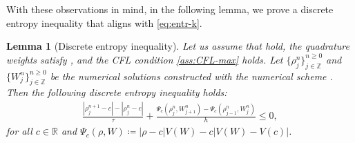 \documentclass[10pt]{amsart}
\theoremstyle{plain}
\newtheorem{lemma}{Lemma}[section]
\theoremstyle{definition}
\numberwithin{equation}{section}
\newcommand{\R}{\mathbb{R}}
\begin{document}
With these observations in mind, in the following lemma, we prove a discrete entropy inequality that aligns with \cref{eq:entr-k}.

\begin{lemma}[Discrete entropy inequality] \label{lm:entro-disc-2}  
Let us assume that  hold, the quadrature weights satisfy , and the CFL condition \cref{ass:CFL-max} holds. 
Let $\{\rho_j^n\}_{j\in\mathbb{Z}}^{n\geq0}$ and $\{W_j^n\}_{j\in\mathbb{Z}}^{n\geq0}$ be the numerical solutions constructed with the numerical scheme . Then the following discrete entropy inequality holds: 
\begin{align}\label{eq:discrete-entropy}
    \frac{|\rho_j^{n+1}-c|-|\rho_j^n-c|}{\tau} + \frac{\Psi_c(\rho_j^n, W_{j+1}^n) - \Psi_c(\rho_{j-1}^n, W_j^n)}{h} \leq 0,
\end{align}
for all $c \in \R$ and  $\Psi_c(\rho,W)\coloneqq |\rho-c|V(W) - c|V(W)-V(c)|$.
\end{lemma}
\end{document}
